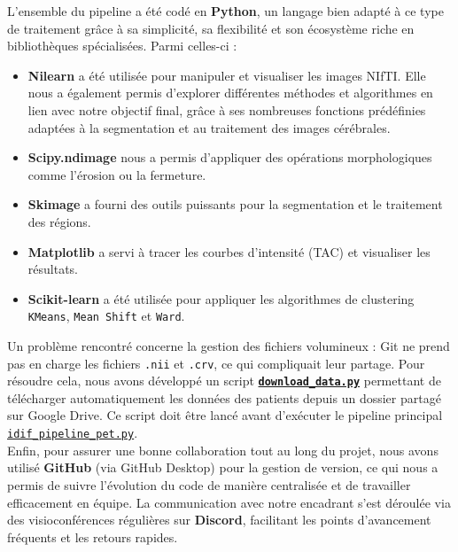 \documentclass[a4paper]{article}
\begin{document}
        \noindent
        L’ensemble du pipeline a été codé en \textbf{Python}, un langage bien adapté à ce type de traitement grâce à sa simplicité, sa flexibilité et son écosystème riche en bibliothèques spécialisées. Parmi celles-ci :
    \begin{itemize}
        \item \textbf{Nilearn} a été utilisée pour manipuler et visualiser les images NIfTI. Elle nous a également permis d’explorer différentes méthodes et algorithmes en lien avec notre objectif final, grâce à ses nombreuses fonctions prédéfinies adaptées à la segmentation et au traitement des images cérébrales.
        \item \textbf{Scipy.ndimage} nous a permis d’appliquer des opérations morphologiques comme l’érosion ou la fermeture.
        \item \textbf{Skimage} a fourni des outils puissants pour la segmentation et le traitement des régions.
        \item \textbf{Matplotlib} a servi à tracer les courbes d’intensité (TAC) et visualiser les résultats.
        \item \textbf{Scikit-learn} a été utilisée pour appliquer les algorithmes de clustering \texttt{KMeans}, \texttt{Mean Shift} et \texttt{Ward}.\\
    \end{itemize}
    
        \noindent
        Un problème rencontré concerne la gestion des fichiers volumineux : Git ne prend pas en charge les fichiers \texttt{.nii} et \texttt{.crv}, ce qui compliquait leur partage. Pour résoudre cela, nous avons développé un script \href{run:./download_data.py}{\textbf{\texttt{download\_data.py}}} permettant de télécharger automatiquement les données des patients depuis un dossier partagé sur Google Drive. Ce script doit être lancé avant d’exécuter le pipeline principal \href{run:./idif_pipeline_pet.py}{\texttt{idif\_pipeline\_pet.py}}.\\

    
        \noindent
        Enfin, pour assurer une bonne collaboration tout au long du projet, nous avons utilisé \textbf{GitHub} (via GitHub Desktop) pour la gestion de version, ce qui nous a permis de suivre l’évolution du code de manière centralisée et de travailler efficacement en équipe. La communication avec notre encadrant s’est déroulée via des visioconférences régulières sur \textbf{Discord}, facilitant les points d’avancement fréquents et les retours rapides.\\
        
\end{document}
